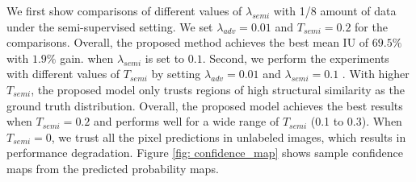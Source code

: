 \documentclass{bmvc2k}
\begin{document}
	We first show comparisons of different values of $\lambda_{semi}$ with 1/8 amount of data under the semi-supervised setting. We set $\lambda_{adv} = 0.01$ and $T_{semi} = 0.2$ for the comparisons.
	Overall, the proposed method achieves the best mean IU of $69.5\%$ with $1.9\%$ gain.
	when $\lambda_{semi}$ is set to  $0.1$.
	Second, we perform the experiments with different values of $T_{semi}$ by setting $\lambda_{adv} = 0.01$ and $\lambda_{semi} = 0.1$ . 
	With higher $T_{semi}$, the proposed model only trusts regions of high structural similarity as the ground truth distribution.
	Overall, the proposed model achieves the best results when $T_{semi} = 0.2$
	and performs well for a wide range of $T_{semi}$ (0.1 to 0.3). 
	When $T_{semi} =  0$, we trust all the pixel predictions in unlabeled images, which results in performance degradation.
	Figure \ref{fig: confidence_map} shows sample confidence maps from the predicted probability maps.
	
\end{document}
